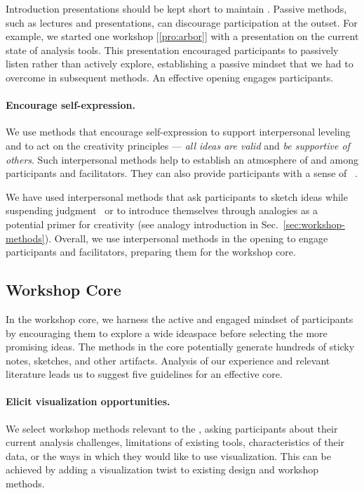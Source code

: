 Introduction presentations should be kept short to maintain \interest. Passive methods, such as lectures and presentations, can discourage participation at the outset. For example, we started one workshop [\ref{pro:arbor}] with a presentation on the current state of analysis tools. This presentation encouraged participants to passively listen rather than actively explore, establishing a passive mindset that we had to overcome in subsequent methods. An effective opening engages participants.

\paragraph{Encourage self-expression.} We use methods that encourage self-expression to support interpersonal leveling and to act on the creativity principles --- {\it all ideas are valid} and {\it be supportive of others}. Such interpersonal methods help to establish an atmosphere of \trust and \collegiality among participants and facilitators. They can also provide participants with a sense of \agency~\cite{Brooks-Harris1999}.

We have used interpersonal methods that ask participants to sketch ideas while suspending judgment~\cite{Rogers2017} or to introduce themselves through analogies as a potential primer for creativity (see analogy introduction in Sec.~\ref{sec:workshop-methods}). Overall, we use interpersonal methods in the opening to engage participants and facilitators, preparing them for the workshop core.

\subsection{Workshop Core}

In the workshop core, we harness the active and engaged mindset of participants by encouraging them to explore a wide ideaspace before selecting the more promising ideas. The methods in the core potentially generate hundreds of sticky notes, sketches, and other artifacts. Analysis of our experience and relevant literature leads us to suggest five guidelines for an effective core.

\paragraph{Elicit visualization opportunities.} We select workshop methods relevant to the \topic, asking participants about their current analysis challenges, limitations of existing tools, characteristics of their data, or the ways in which they would like to use visualization. This can be achieved by adding a visualization twist to existing design and workshop methods. 

